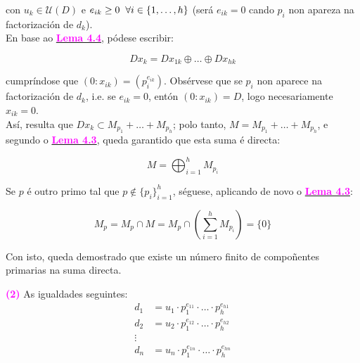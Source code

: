 \documentclass[twoside]{report}
\newcommand{\magbf}[1]{\textcolor{magenta}{\textbf{#1}}} %
\theoremstyle{mystyle}
\begin{document}
\vspace{2mm}

\noindent  con $u_{k} \in \mathcal{U}(D)$ e $e_{ik} \geq 0 \hspace{2mm} \forall i \in \{1, \ldots, h\}$ (será $e_{ik} = 0$ cando $p_{i}$ non apareza na factorización de $d_{k}$).\\

\noindent En base ao \hyperref[lem4.4]{\magbf{Lema 4.4}}, pódese escribir:

$$Dx_{k} = Dx_{1k} \oplus \dots \oplus Dx_{hk}$$

\vspace{2mm}

\noindent cumpríndose que $(0 : x_{ik}) = (p_{i}^{e_{ik}})$. Obsérvese que se $p_{i}$ non aparece na factorización de $d_{k}$, i.e. se $e_{ik} = 0$, entón $(0 : x_{ik}) = D$, logo necesariamente
$x_{ik} = 0$.\\

\noindent Así, resulta que $Dx_{k} \subset  M_{p_{1}} + \dots + M_{p_{h}}$; polo tanto, $M = M_{p_{1}} + \ldots + M_{p_{h}}$, e segundo o \hyperref[lem4.3]{\magbf{Lema 4.3}}, queda garantido que esta suma é directa:

$$M = \displaystyle \bigoplus_{i = 1}^{h}M_{p_{i}}$$

\vspace{2mm}

\noindent Se $p$ é outro primo tal que $p \notin \{p_{i}\}_{i = 1}^{h}$, séguese, aplicando de novo o \hyperref[lem4.3]{\magbf{Lema 4.3}}:

$$M_{p}  = M_{p} \cap M = M_{p} \cap \displaystyle \left(\sum_{i = 1}^{h}M_{p_{i}}\right) = \{0\}$$

\vspace{2mm}

\noindent Con isto, queda demostrado que existe un número finito de compoñentes primarias na suma directa.

\noindent \magbf{(2)} As igualdades seguintes:
\begin{align*}
    d_{1} & = u_{1} \cdot p_{1}^{e_{11}} \cdot \ldots \cdot p_{h}^{e_{h1}} \\
    d_{2} & = u_{2} \cdot p_{1}^{e_{12}} \cdot \ldots \cdot p_{h}^{e_{h2}} \\
    \vdots \\
    d_{n} & = u_{n} \cdot p_{1}^{e_{1n}} \cdot \ldots \cdot p_{h}^{e_{hn}}
\end{align*}

\vspace{2mm}
\end{document}

